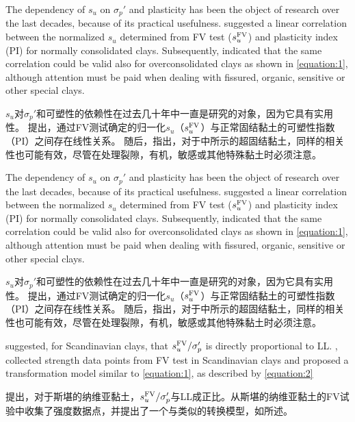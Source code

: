 \begin{paracol}{2}
    
    The dependency of $s_u$ on $\sigma_p'$ and plasticity has been the object of research over the last decades, because of its practical usefulness. \citet{Skempton195419} suggested a linear correlation between the normalized $s_u$ determined from FV test ($s_u^{\rm{FV}}$) and plasticity index (PI) for normally consolidated clays. Subsequently, \citet{Chandler198813} indicated that the same correlation could be valid also for overconsolidated clays as shown in \autoref{equation:1}, although attention must be paid when dealing with fissured, organic, sensitive or other special clays.

    \switchcolumn

    $s_u$对$\sigma_p'$和可塑性的依赖性在过去几十年中一直是研究的对象，因为它具有实用性。 \citet{Skempton195419}提出，通过FV测试确定的归一化$s_u$（$s_u^{\rm{FV}}$）与正常固结黏土的可塑性指数（PI）之间存在线性关系。 随后，\citet{Chandler198813}指出，对于中所示的超固结黏土，同样的相关性也可能有效，尽管在处理裂隙，有机，敏感或其他特殊黏土时必须注意。

    \switchcolumn*

    The dependency of $s_u$ on $\sigma_p'$ and plasticity has been the object of research over the last decades, because of its practical usefulness. \citet{Skempton195419} suggested a linear correlation between the normalized $s_u$ determined from FV test ($s_u^{\rm{FV}}$) and plasticity index (PI) for normally consolidated clays. Subsequently, \citet{Chandler198813} indicated that the same correlation could be valid also for overconsolidated clays as shown in \autoref{equation:1}, although attention must be paid when dealing with fissured, organic, sensitive or other special clays.

    \switchcolumn

    $s_u$对$\sigma_p'$和可塑性的依赖性在过去几十年中一直是研究的对象，因为它具有实用性。 \citet{Skempton195419}提出，通过FV测试确定的归一化$s_u$（$s_u^{\rm{FV}}$）与正常固结黏土的可塑性指数（PI）之间存在线性关系。 随后，\citet{Chandler198813}指出，对于中所示的超固结黏土，同样的相关性也可能有效，尽管在处理裂隙，有机，敏感或其他特殊黏土时必须注意。

    \switchcolumn*

    \citet{Hansbo1957}suggested, for Scandinavian clays, that $s_u^{\rm{FV}}/\sigma_p'$ is directly proportional to LL. \citet{Larsson1980591}, collected strength data points from FV test in Scandinavian clays and proposed a transformation model similar to \autoref{equation:1}, as described by \autoref{equation:2}

    \switchcolumn

    \citet{Hansbo1957}提出，对于斯堪的纳维亚黏土，$s_u^{\rm{FV}}/\sigma_p'$与LL成正比。\citet{Larsson1980591}从斯堪的纳维亚黏土的FV试验中收集了强度数据点，并提出了一个与类似的转换模型，如所述。

\end{paracol}

